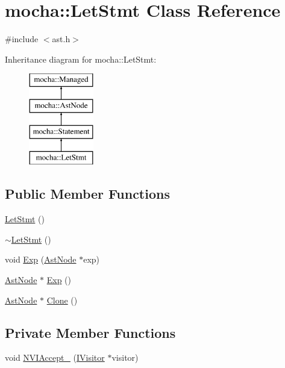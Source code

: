 \hypertarget{classmocha_1_1_let_stmt}{
\section{mocha::LetStmt Class Reference}
\label{classmocha_1_1_let_stmt}
}


{\ttfamily \#include $<$ast.h$>$}

Inheritance diagram for mocha::LetStmt:\begin{figure}[H]
\begin{center}
\leavevmode
\includegraphics[height=4.000000cm]{classmocha_1_1_let_stmt}
\end{center}
\end{figure}
\subsection*{Public Member Functions}
\begin{DoxyCompactItemize}
\item 
\hyperlink{classmocha_1_1_let_stmt_aca9adea081cb0f16631dcd4b64ffdc30}{LetStmt} ()
\item 
\hyperlink{classmocha_1_1_let_stmt_a23eeee2504f241d61e6ec0da2a0fd7df}{$\sim$LetStmt} ()
\item 
void \hyperlink{classmocha_1_1_let_stmt_ae0b9d728fcebde0f3e695d883b73d768}{Exp} (\hyperlink{classmocha_1_1_ast_node}{AstNode} $\ast$exp)
\item 
\hyperlink{classmocha_1_1_ast_node}{AstNode} $\ast$ \hyperlink{classmocha_1_1_let_stmt_a640e83fd93f5eb70fd2ae8839178e6d7}{Exp} ()
\item 
\hyperlink{classmocha_1_1_ast_node}{AstNode} $\ast$ \hyperlink{classmocha_1_1_let_stmt_a43030a387da699ac560948020ddeb77b}{Clone} ()
\end{DoxyCompactItemize}
\subsection*{Private Member Functions}
\begin{DoxyCompactItemize}
\item 
void \hyperlink{classmocha_1_1_let_stmt_a5d20086563ecfcf5f7da28eb19bead94}{NVIAccept\_\-} (\hyperlink{classmocha_1_1_i_visitor}{IVisitor} $\ast$visitor)
\end{DoxyCompactItemize}
